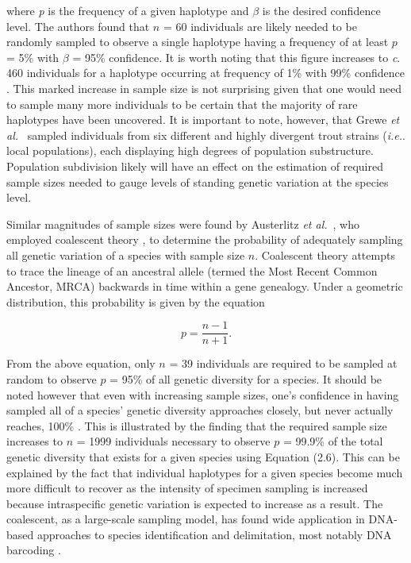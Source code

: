 \noindent where \textit{p} is the frequency of a given haplotype and $\beta$ is the desired confidence level. The authors found that $n$ = 60 individuals are likely needed to be randomly sampled to observe a single haplotype having a frequency of at least $p$ = 5\% with $\beta$ = 95\% confidence. It is worth noting that this figure increases to \textit{c}. 460 individuals for a haplotype occurring at frequency of 1\% with 99\% confidence \cite{grewe1993mitochondrial}. This marked increase in sample size is not surprising given that one would need to sample many more individuals to be certain that the majority of rare haplotypes have been uncovered. It is important to note, however, that Grewe \textit{et al.}~\cite{grewe1993mitochondrial} sampled individuals from six different and highly divergent trout strains (\textit{i.e.}. local populations), each displaying high degrees of population substructure. Population subdivision likely will have an effect on the estimation of required sample sizes needed to gauge levels of standing genetic variation at the species level. 



Similar magnitudes of sample sizes were found by Austerlitz \textit{et al.}~\cite{austerlitz2009dna}, who employed coalescent theory \cite{kingman1982coalescent}, to determine the probability of adequately sampling all genetic variation of a species with sample size $n$. Coalescent theory attempts to trace the lineage of an ancestral allele (termed the Most Recent Common Ancestor, MRCA) backwards in time within a gene genealogy. Under a geometric distribution, this probability is given by the equation \cite{austerlitz2009dna}

\begin{equation}
p = \frac{n - 1}{n + 1}.
\end{equation}



\noindent From the above equation, only $n$ = 39 individuals are required to be sampled at random to observe $p$ = 95\% of all genetic diversity for a species. It should be noted however that even with increasing sample sizes, one's confidence in having sampled all of a species’ genetic diversity approaches closely, but never actually reaches, 100\% \cite{austerlitz2009dna}. This is illustrated by the finding that the required sample size increases to $n$ = 1999 individuals necessary to observe $p$ = 99.9\% of the total genetic diversity that exists for a given species using Equation (2.6). This can be explained by the fact that individual haplotypes for a given species become much more difficult to recover as the intensity of specimen sampling is increased because intraspecific genetic variation is expected to increase as a result. The coalescent, as a large-scale sampling model, has found wide application in DNA-based approaches to species identification and delimitation, most notably DNA barcoding \cite{hubert2015dna}.



